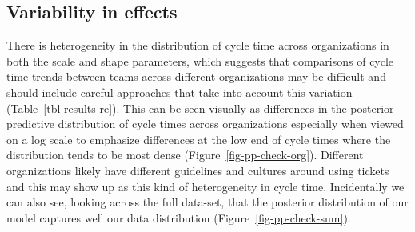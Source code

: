 \documentclass[manuscript,screen,review]{acmart}
\begin{document}
\subsection{Variability in effects}\label{variability-in-effects}

There is heterogeneity in the distribution of cycle time across
organizations in both the scale and shape parameters, which suggests
that comparisons of cycle time trends between teams across different
organizations may be difficult and should include careful approaches
that take into account this variation (Table~\ref{tbl-results-re}). This
can be seen visually as differences in the posterior predictive
distribution of cycle times across organizations especially when viewed
on a log scale to emphasize differences at the low end of cycle times
where the distribution tends to be most dense
(Figure~\ref{fig-pp-check-org}). Different organizations likely have
different guidelines and cultures around using tickets and this may show
up as this kind of heterogeneity in cycle time. Incidentally we can also
see, looking across the full data-set, that the posterior distribution
of our model captures well our data distribution
(Figure~\ref{fig-pp-check-sum}).

\providecommand{\ascline}[3]{\noalign{\global\arrayrulewidth #1}\arrayrulecolor[HTML]{#2}\cline{#3}}
\end{document}
